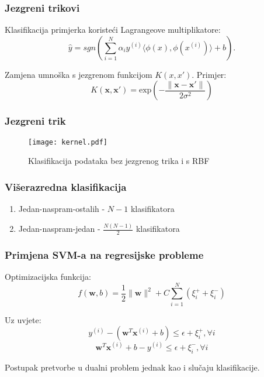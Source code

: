 \documentclass[utf8]{beamer}
\begin{document}
\begin{frame}
\frametitle{Jezgreni trikovi}
Klasifikacija primjerka koristeći Lagrangeove multiplikatore:
\begin{equation*}
  \hat{y} = sgn(\sum_{i=1}^{N} \alpha_iy^{(i)}\langle \phi(x), \phi(x^{(i)}) \rangle
  + b).
\end{equation*}

Zamjena umnoška s \alert{jezgrenom funkcijom} $K(x, x')$. Primjer:
\begin{equation*}
  K(\mathbf{x}, \mathbf{x}') = \text{exp}(- \frac{\|\mathbf{x} - \mathbf{x}'\|}{2\sigma^2})
\end{equation*}
\end{frame}

\begin{frame}
\frametitle{Jezgreni trik}
\begin{figure}
\texttt{[image: kernel.pdf]}
\caption{Klasifikacija podataka bez jezgrenog trika i s RBF}
\label{fig:kernel}
\end{figure}
\end{frame}

\begin{frame}
\frametitle{Višerazredna klasifikacija}
\begin{enumerate}
\item Jedan-naspram-ostalih - $N-1$ klasifikatora
\item Jedan-naspram-jedan - $\frac{N(N - 1)}{2}$ klasifikatora
\end{enumerate}
\end{frame}

\begin{frame}
\frametitle{Primjena SVM-a na regresijske probleme}

Optimizacijska funkcija:
\begin{equation*}
  f(\mathbf{w}, b) = \frac{1}{2}\|\mathbf{w}\|^2 + 
  C\sum_{i=1}^{N}(\xi_i^+ + \xi_i^-)
\end{equation*}

Uz uvjete:
\begin{equation*}
y^{(i)} - (\mathbf{w}^T\mathbf{x}^{(i)} + b) \leq \epsilon + \xi_i^+, \forall i 
\end{equation*}
\begin{equation*}
\mathbf{w}^T\mathbf{x}^{(i)} + b - y^{(i)} \leq \epsilon + \xi_i^-, \forall i
\end{equation*}

Postupak pretvorbe u dualni problem jednak kao i slučaju klasifikacije.
\end{frame}
\end{document}
